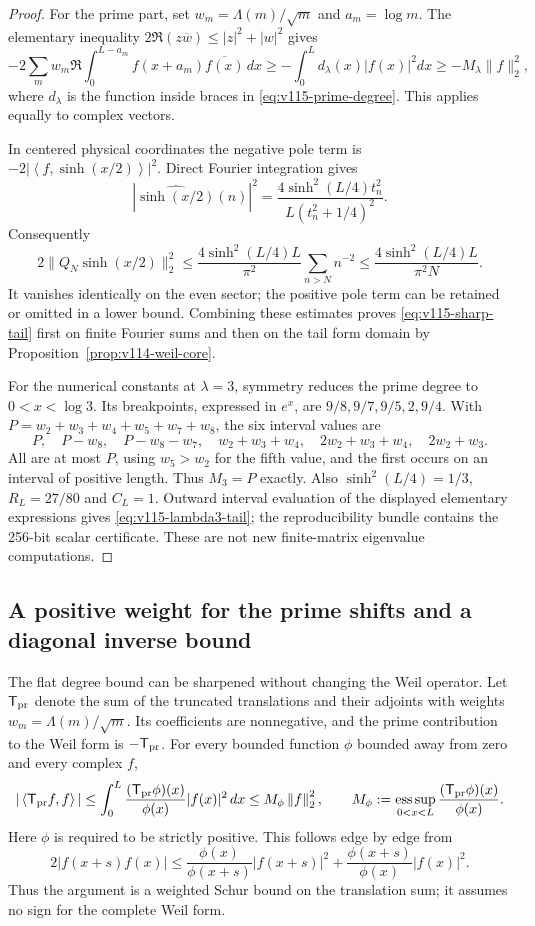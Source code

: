 \documentclass[11pt]{article}
\theoremstyle{remark}
\newcommand{\norm}[1]{\left\lVert #1\right\rVert}
\newcommand{\ip}[2]{\left\langle #1,#2\right\rangle}
\begin{document}
\begin{proof}
For the prime part, set $w_m=\Lambda(m)/\sqrt m$ and $a_m=\log m$.
The elementary inequality $2\Re(z\overline w)\le|z|^2+|w|^2$ gives
\[
 -2\sum_m w_m\Re\int_0^{L-a_m}
      f(x+a_m)\overline{f(x)}\,dx
 \ge-\int_0^L d_\lambda(x)|f(x)|^2dx
 \ge-M_\lambda\|f\|_2^2,
\]
where $d_\lambda$ is the function inside braces in
\eqref{eq:v115-prime-degree}. This applies equally to complex vectors.

In centered physical coordinates the negative pole term is
$-2|\ip f{\sinh(x/2)}|^2$. Direct Fourier integration gives
\[
 |\widehat{\sinh(x/2)}(n)|^2
 =\frac{4\sinh^2(L/4)t_n^2}{L(t_n^2+1/4)^2}.
\]
Consequently
\[
 2\|Q_N\sinh(x/2)\|_2^2
 \le\frac{4\sinh^2(L/4)L}{\pi^2}
                         \sum_{n>N}n^{-2}
 \le\frac{4\sinh^2(L/4)L}{\pi^2N}.
\]
It vanishes identically on the even sector; the positive pole term can
be retained or omitted in a lower bound. Combining these estimates
proves \eqref{eq:v115-sharp-tail} first on finite Fourier sums and then
on the tail form domain by Proposition~\ref{prop:v114-weil-core}.

For the numerical constants at $\lambda=3$, symmetry reduces the prime
degree to $0<x<\log3$. Its breakpoints, expressed in $e^x$, are
$9/8,9/7,9/5,2,9/4$. With
$P=w_2+w_3+w_4+w_5+w_7+w_8$, the six interval values are
\[
 P,\quad P-w_8,\quad P-w_8-w_7,\quad
 w_2+w_3+w_4,\quad2w_2+w_3+w_4,\quad2w_2+w_3.
\]
All are at most $P$, using $w_5>w_2$ for the fifth value, and the first
occurs on an interval of positive length. Thus $M_3=P$ exactly.
Also $\sinh^2(L/4)=1/3$, $R_L=27/80$ and $C_L=1$.
Outward interval evaluation of the displayed elementary expressions
gives \eqref{eq:v115-lambda3-tail}; the reproducibility bundle contains
the 256-bit scalar certificate. These are not new finite-matrix
eigenvalue computations.
\end{proof}

\subsection*{A positive weight for the prime shifts and a diagonal inverse bound}
The flat degree bound can be sharpened without changing the Weil operator.
Let $\mathsf T_{\rm pr}$ denote the sum of the truncated translations and
their adjoints with weights $w_m=\Lambda(m)/\sqrt m$. Its coefficients
are nonnegative, and the prime contribution to the Weil form is
$-\mathsf T_{\rm pr}$. For every bounded function $\phi$ bounded away
from zero and every complex $f$,
\begin{equation}\label{eq:v116-weighted-prime-general}
 |\ip{\mathsf T_{\rm pr}f}{f}|
 \le\int_0^L\frac{(\mathsf T_{\rm pr}\phi)(x)}{\phi(x)}|f(x)|^2\,dx
 \le M_\phi\norm f_2^2,
 \qquad
 M_\phi:=\mathop{\rm ess\,sup}_{0<x<L}
       \frac{(\mathsf T_{\rm pr}\phi)(x)}{\phi(x)}.
\end{equation}
Here $\phi$ is required to be strictly positive. This follows edge by
edge from
\[
 2|f(x+s)f(x)|\le
 \frac{\phi(x)}{\phi(x+s)}|f(x+s)|^2
 +\frac{\phi(x+s)}{\phi(x)}|f(x)|^2.
\]
Thus the argument is a weighted Schur bound on the translation sum;
it assumes no sign for the complete Weil form.
\end{document}
